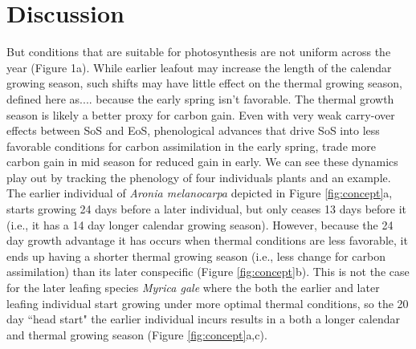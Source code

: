 \documentclass[12 pt]{article}
\begin{document}
\section{Discussion}
But conditions that are suitable for photosynthesis are not uniform across the year (Figure 1a). While earlier leafout may increase the length of the calendar growing season, such shifts may have little effect on the thermal growing season, defined here as....\citep{} because the early spring isn't favorable. The thermal growth season is likely a better proxy for carbon gain. Even with very weak carry-over effects between SoS and EoS, phenological advances that drive SoS into less favorable conditions for carbon assimilation in the early spring, trade more carbon gain in mid season for reduced gain in early. 
We can see these dynamics play out by tracking the phenology of four individuals plants and an example. The earlier individual of \emph{Aronia melanocarpa} depicted in Figure \ref{fig:concept}a, starts growing 24 days before a later individual, but only ceases 13 days before it (i.e., it has a 14 day longer calendar growing season). However, because the 24 day growth advantage it has occurs when thermal conditions are less favorable, it ends up having a shorter thermal growing season (i.e., less change for carbon assimilation) than its later conspecific (Figure \ref{fig:concept}b). This is not the case for the later leafing species \emph{Myrica gale} where the both the earlier and later leafing individual start growing under more optimal thermal conditions, so the 20 day ``head start" the earlier individual incurs results in a both a longer calendar and thermal growing season (Figure \ref{fig:concept}a,c). 
\end{document}

